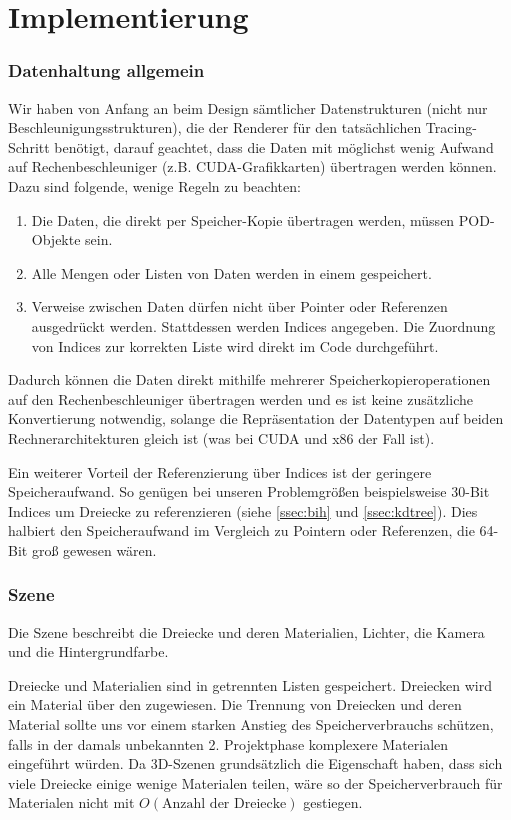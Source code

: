 \part{Implementierung}

\section{Datenhaltung allgemein}

Wir haben von Anfang an beim Design sämtlicher Datenstrukturen (nicht nur Beschleunigungsstrukturen), die der Renderer für den tatsächlichen Tracing-Schritt benötigt, darauf geachtet, dass die Daten mit möglichst wenig Aufwand auf Rechenbeschleuniger (z.B. CUDA-Grafikkarten) übertragen werden können. Dazu sind folgende, wenige Regeln zu beachten:

\begin{enumerate}
\item Die Daten, die direkt per Speicher-Kopie übertragen werden, müssen POD-Objekte sein.
\item Alle Mengen oder Listen von Daten werden in einem  gespeichert.
\item Verweise zwischen Daten dürfen nicht über Pointer oder Referenzen ausgedrückt werden. Stattdessen werden Indices angegeben. Die Zuordnung von Indices zur korrekten Liste wird direkt im Code durchgeführt.
\end{enumerate}

Dadurch können die Daten direkt mithilfe mehrerer Speicherkopieroperationen auf den Rechenbeschleuniger übertragen werden und es ist keine zusätzliche Konvertierung notwendig, solange die Repräsentation der Datentypen auf beiden Rechnerarchitekturen gleich ist (was bei CUDA und x86 der Fall ist).

Ein weiterer Vorteil der Referenzierung über Indices ist der geringere Speicheraufwand. So genügen bei unseren Problemgrößen beispielsweise 30-Bit Indices um Dreiecke zu referenzieren (siehe \ref{ssec:bih} und \ref{ssec:kdtree}). Dies halbiert den Speicheraufwand im Vergleich zu Pointern oder Referenzen, die 64-Bit groß gewesen wären.

\section{Szene}

Die Szene beschreibt die Dreiecke und deren Materialien, Lichter, die Kamera und die Hintergrundfarbe.

Dreiecke und Materialien sind in getrennten Listen gespeichert. Dreiecken wird ein Material über den  zugewiesen. Die Trennung von Dreiecken und deren Material sollte uns vor einem starken Anstieg des Speicherverbrauchs schützen, falls in der damals unbekannten 2. Projektphase komplexere Materialen eingeführt würden. Da 3D-Szenen grundsätzlich die Eigenschaft haben, dass sich viele Dreiecke einige wenige Materialen teilen, wäre so der Speicherverbrauch für Materialen nicht mit $O(\text{Anzahl der Dreiecke})$ gestiegen.

